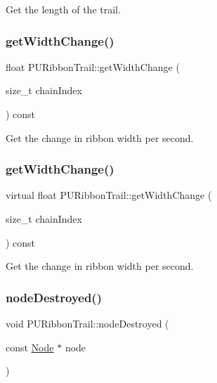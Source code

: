 Get the length of the trail. \mbox{\label{classPURibbonTrail_a4a8d19d06f53121cc8c6332a5c7106ef}} 
\subsubsection{\texorpdfstring{get\+Width\+Change()}{getWidthChange()}\hspace{0.1cm}{\footnotesize\ttfamily [1/2]}}
{\footnotesize\ttfamily float P\+U\+Ribbon\+Trail\+::get\+Width\+Change (\begin{DoxyParamCaption}\item[{size\+\_\+t}]{chain\+Index }\end{DoxyParamCaption}) const\hspace{0.3cm}{\ttfamily [virtual]}}

Get the change in ribbon width per second. \mbox{\label{classPURibbonTrail_aefadbf42e7c96432fdf60511b78b3289}} 
\subsubsection{\texorpdfstring{get\+Width\+Change()}{getWidthChange()}\hspace{0.1cm}{\footnotesize\ttfamily [2/2]}}
{\footnotesize\ttfamily virtual float P\+U\+Ribbon\+Trail\+::get\+Width\+Change (\begin{DoxyParamCaption}\item[{size\+\_\+t}]{chain\+Index }\end{DoxyParamCaption}) const\hspace{0.3cm}{\ttfamily [virtual]}}

Get the change in ribbon width per second. \mbox{\label{classPURibbonTrail_a2330a097fe804b197556eff5bce345ec}} 
\subsubsection{\texorpdfstring{node\+Destroyed()}{nodeDestroyed()}\hspace{0.1cm}{\footnotesize\ttfamily [1/2]}}
{\footnotesize\ttfamily void P\+U\+Ribbon\+Trail\+::node\+Destroyed (\begin{DoxyParamCaption}\item[{const \hyperlink{classNode}{Node} $\ast$}]{node }\end{DoxyParamCaption})}

